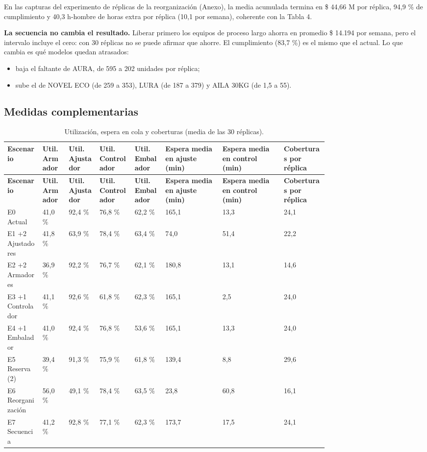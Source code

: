 \documentclass[11pt,a4paper]{article}
\begin{document}
En las capturas del experimento de réplicas de la reorganización (Anexo), la media acumulada termina en \$ 44,66 M por réplica, 94,9 \% de cumplimiento y 40,3 h-hombre de horas extra por réplica (10,1 por semana), coherente con la Tabla 4.

\textbf{La secuencia no cambia el resultado.} Liberar primero los equipos de proceso largo ahorra en promedio \$ 14.194 por semana, pero el intervalo incluye el cero: con 30 réplicas no se puede afirmar que ahorre. El cumplimiento (83,7 \%) es el mismo que el actual. Lo que cambia es qué modelos quedan atrasados:

\begin{itemize}
\item baja el faltante de AURA, de 595 a 202 unidades por réplica;
\item sube el de NOVEL ECO (de 259 a 353), LURA (de 187 a 379) y AILA 30KG (de 1,5 a 55).
\end{itemize}

\subsection{Medidas complementarias}

{\footnotesize
\begin{longtable}{P{0.083\linewidth}P{0.063\linewidth}P{0.073\linewidth}P{0.083\linewidth}P{0.073\linewidth}P{0.136\linewidth}P{0.141\linewidth}P{0.107\linewidth}}
\caption{Utilización, espera en cola y coberturas (media de las 30 réplicas).}\\
\textbf{Escenario} & \textbf{Util. Armador} & \textbf{Util. Ajustador} & \textbf{Util. Controlador} & \textbf{Util. Embalador} & \textbf{Espera media en ajuste (min)} & \textbf{Espera media en control (min)} & \textbf{Coberturas por réplica} \\
\endfirsthead
{}\textbf{Escenario} & \textbf{Util. Armador} & \textbf{Util. Ajustador} & \textbf{Util. Controlador} & \textbf{Util. Embalador} & \textbf{Espera media en ajuste (min)} & \textbf{Espera media en control (min)} & \textbf{Coberturas por réplica} \\
\endhead
E0 Actual & 41,0 \% & 92,4 \% & 76,8 \% & 62,2 \% & 165,1 & 13,3 & 24,1 \\
E1 +2 Ajustadores & 41,8 \% & 63,9 \% & 78,4 \% & 63,4 \% & 74,0 & 51,4 & 22,2 \\
E2 +2 Armadores & 36,9 \% & 92,2 \% & 76,7 \% & 62,1 \% & 180,8 & 13,1 & 14,6 \\
E3 +1 Controlador & 41,1 \% & 92,6 \% & 61,8 \% & 62,3 \% & 165,1 & 2,5 & 24,0 \\
E4 +1 Embalador & 41,0 \% & 92,4 \% & 76,8 \% & 53,6 \% & 165,1 & 13,3 & 24,0 \\
E5 Reserva (2) & 39,4 \% & 91,3 \% & 75,9 \% & 61,8 \% & 139,4 & 8,8 & 29,6 \\
E6 Reorganización & 56,0 \% & 49,1 \% & 78,4 \% & 63,5 \% & 23,8 & 60,8 & 16,1 \\
E7 Secuencia & 41,2 \% & 92,8 \% & 77,1 \% & 62,3 \% & 173,7 & 17,5 & 24,1 \\
\end{longtable}
}
\end{document}
